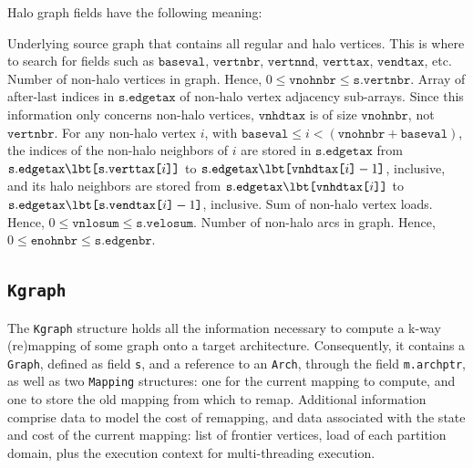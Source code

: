 Halo graph fields have the following meaning:
\begin{itemize}
\iteme[\texttt{s}]
Underlying source graph that contains all regular and halo
vertices. This is where to search for fields such as
$\mathtt{baseval}$, $\mathtt{vertnbr}$, $\mathtt{vertnnd}$,
$\mathtt{verttax}$, $\mathtt{vendtax}$, etc.
Number of non-halo vertices in graph. Hence, $0 \leq \mathtt{vnohnbr}
\leq \mathtt{s.vertnbr}$.
Array of after-last indices in $\mathtt{s.edgetax}$ of non-halo vertex
adjacency sub-arrays. Since this information only concerns non-halo
vertices, $\mathtt{vnhdtax}$ is of size $\mathtt{vnohnbr}$, not
$\mathtt{vertnbr}$.
For any non-halo vertex $i$, with $\mathtt{baseval} \leq i <
(\mathtt{vnohnbr} + \mathtt{baseval})$, the indices of the non-halo
neighbors of $i$ are stored in $\mathtt{s.edgetax}$ from $\mathtt{s.edgetax}\lbt
\mbox{\texttt{[}}\mathtt{s.verttax}\mbox{\texttt{[}}i\mbox{\texttt{]]}}$
to $\mathtt{s.edgetax}\lbt
\mbox{\texttt{[}}\mathtt{vnhdtax}\mbox{\texttt{[}}i\mbox{\texttt{]}} -
1\mbox{\texttt{]}}$, inclusive, and its halo neighbors are stored from
$\mathtt{s.edgetax}\lbt
\mbox{\texttt{[}}\mathtt{vnhdtax}\mbox{\texttt{[}}i\mbox{\texttt{]]}}$
to $\mathtt{s.edgetax}\lbt
\mbox{\texttt{[}}\mathtt{s.vendtax}\mbox{\texttt{[}}i\mbox{\texttt{]}} -
1\mbox{\texttt{]}}$, inclusive.
Sum of non-halo vertex loads. Hence, $0 \leq \mathtt{vnlosum}
\leq \mathtt{s.velosum}$.
Number of non-halo arcs in graph. Hence, $0 \leq \mathtt{enohnbr}
\leq \mathtt{s.edgenbr}$.
\end{itemize}

\subsection{\texttt{Kgraph}}
\label{sec-data-kgraph}

The \texttt{Kgraph} structure holds all the information necessary to
compute a k-way (re)mapping of some graph onto a target architecture.
Consequently, it contains a \texttt{Graph}, defined as field
\texttt{s}, and a reference to an \texttt{Arch}, through the field
\texttt{m.archptr}, as well as two \texttt{Mapping} structures: one
for the current mapping to compute, and one to store the old mapping
from which to remap. Additional information comprise data to model the
cost of remapping, and data associated with the state and cost of the
current mapping: list of frontier vertices, load of each partition
domain, plus the execution context for multi-threading execution.

